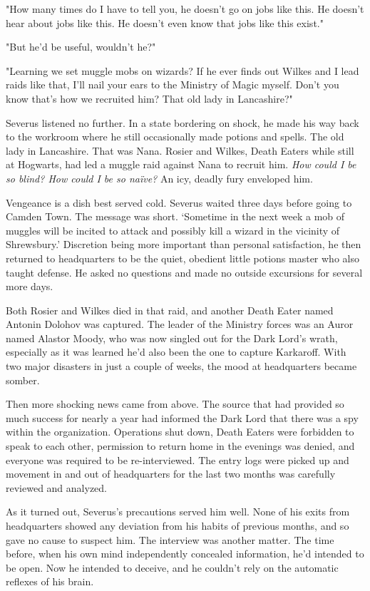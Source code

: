 \documentclass[a4paper,11pt]{article}
\begin{document}
"How many times do I have to tell you, he doesn't go on jobs like this. He doesn't hear about jobs like this. He doesn't even know that jobs like this exist."

"But he'd be useful, wouldn't he?"

"Learning we set muggle mobs on wizards? If he ever finds out Wilkes and I lead raids like that, I'll nail your ears to the Ministry of Magic myself. Don't you know that's how we recruited him? That old lady in Lancashire?"

Severus listened no further. In a state bordering on shock, he made his way back to the workroom where he still occasionally made potions and spells. The old lady in Lancashire. That was Nana. Rosier and Wilkes, Death Eaters while still at Hogwarts, had led a muggle raid against Nana to recruit him. \emph{How could I be so blind? How could I be so naïve?} An icy, deadly fury enveloped him.

Vengeance is a dish best served cold. Severus waited three days before going to Camden Town. The message was short. `Sometime in the next week a mob of muggles will be incited to attack and possibly kill a wizard in the vicinity of Shrewsbury.' Discretion being more important than personal satisfaction, he then returned to headquarters to be the quiet, obedient little potions master who also taught defense. He asked no questions and made no outside excursions for several more days.

Both Rosier and Wilkes died in that raid, and another Death Eater named Antonin Dolohov was captured. The leader of the Ministry forces was an Auror named Alastor Moody, who was now singled out for the Dark Lord's wrath, especially as it was learned he'd also been the one to capture Karkaroff. With two major disasters in just a couple of weeks, the mood at headquarters became somber.

Then more shocking news came from above. The source that had provided so much success for nearly a year had informed the Dark Lord that there was a spy within the organization. Operations shut down, Death Eaters were forbidden to speak to each other, permission to return home in the evenings was denied, and everyone was required to be re-interviewed. The entry logs were picked up and movement in and out of headquarters for the last two months was carefully reviewed and analyzed.

As it turned out, Severus's precautions served him well. None of his exits from headquarters showed any deviation from his habits of previous months, and so gave no cause to suspect him. The interview was another matter. The time before, when his own mind independently concealed information, he'd intended to be open. Now he intended to deceive, and he couldn't rely on the automatic reflexes of his brain.
\end{document}
